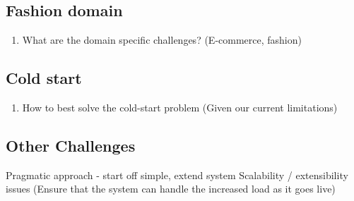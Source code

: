 \subsection{Fashion domain}
\begin{enumerate}
  \item What are the domain specific challenges? (E-commerce, fashion)
\end{enumerate}

\subsection{Cold start}
\begin{enumerate}
  \item How to best solve the cold-start problem (Given our current limitations)
\end{enumerate}


\subsection{Other Challenges}
Pragmatic approach - start off simple, extend system
Scalability / extensibility issues (Ensure that the system can handle the increased load as it goes live)




